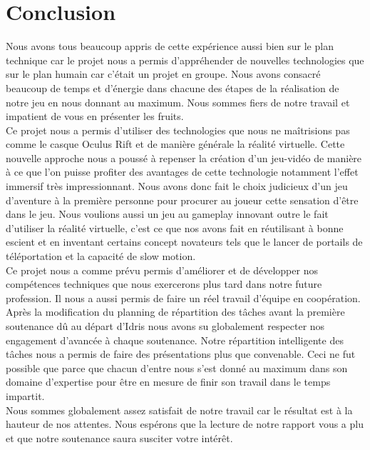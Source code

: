 \documentclass[12pt]{article}
\begin{document}
\newpage

\section*{Conclusion}

Nous avons tous beaucoup appris de cette expérience aussi bien sur le plan technique car le projet nous a permis d'appréhender de nouvelles technologies que sur le plan humain car c'était un projet en groupe. Nous avons consacré beaucoup de temps et d'énergie dans chacune des étapes de la réalisation de notre jeu en nous donnant au maximum. Nous sommes fiers de notre travail et impatient de vous en présenter les fruits.\\
Ce projet nous a permis d'utiliser des technologies que nous ne maîtrisions pas comme le casque Oculus Rift et de manière générale la réalité virtuelle. Cette nouvelle approche nous a poussé à repenser la création d'un jeu-vidéo de manière à ce que l'on puisse profiter des avantages de cette technologie notamment l'effet immersif très impressionnant. Nous avons donc fait le choix judicieux d'un jeu d'aventure à la première personne pour procurer au joueur cette sensation d'être dans le jeu. Nous voulions aussi un jeu au gameplay innovant outre le fait d'utiliser la réalité virtuelle, c'est ce que nos avons fait en réutilisant à bonne escient et en inventant certains concept novateurs tels que le lancer de portails de téléportation et la capacité de slow motion.\\

Ce projet nous a comme prévu permis d'améliorer et de développer nos compétences techniques que nous exercerons plus tard dans notre future profession. Il nous a aussi permis de faire un réel travail d'équipe en coopération.\\
Après la modification du planning de répartition des tâches avant la première soutenance dû au départ d'Idris nous avons su globalement respecter nos engagement d'avancée à chaque soutenance. Notre répartition intelligente des tâches nous a permis de faire des présentations plus que convenable. Ceci ne fut possible que parce que chacun d'entre nous s'est donné au maximum dans son domaine d'expertise pour être en mesure de finir son travail dans le temps impartit.\\
Nous sommes globalement assez satisfait de notre travail car le résultat est à la hauteur de nos attentes. Nous espérons que la lecture de notre rapport vous a plu et que notre soutenance saura susciter votre intérêt.

\newpage

\listoffigures

\newpage

\printglossaries

\newpage



\end{document}
